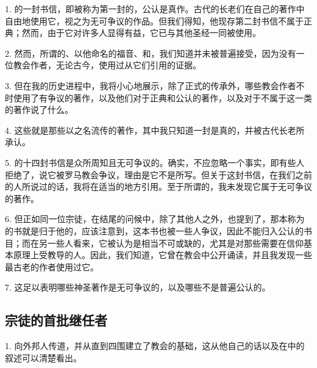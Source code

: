 1. 的一封书信，即被称为第一封的，公认是真作。古代的长老们在自己的著作中自由地使用它，视之为无可争议的作品。但我们得知，他现存第二封书信不属于正典；然而，由于它对许多人显得有益，它已与其他圣经一同被使用。\par

2. 然而，所谓的、以他命名的福音、和，我们知道并未被普遍接受，因为没有一位教会作者，无论古今，使用过从它们引用的证据。\par

3. 但在我的历史进程中，我将小心地展示，除了正式的传承外，哪些教会作者不时使用了有争议的著作，以及他们对于正典和公认的著作，以及对于不属于这一类的著作说了什么。\par

4. 这些就是那些以之名流传的著作，其中我只知道一封是真的，并被古代长老所承认。\par

5. 的十四封书信是众所周知且无可争议的。确实，不应忽略一个事实，即有些人拒绝了，说它被罗马教会争议，理由是它不是所写。但关于这封书信，在我们之前的人所说过的话，我将在适当的地方引用。至于所谓的，我未发现它属于无可争议的著作。\par

6. 但正如同一位宗徒，在结尾的问候中，除了其他人之外，也提到了，那本称为的书就是归于他的，应该注意到，这本书也被一些人争议，因此不能归入公认的书目；而在另一些人看来，它被认为是相当不可或缺的，尤其是对那些需要在信仰基本原理上受教导的人。因此，我们知道，它曾在教会中公开诵读，并且我发现一些最古老的作者使用过它。\par

7. 这足以表明哪些神圣著作是无可争议的，以及哪些不是普遍公认的。\par


\subsection{宗徒的首批继任者}

1. 向外邦人传道，并从直到四围建立了教会的基础，这从他自己的话以及在中的叙述可以清楚看出。\par

